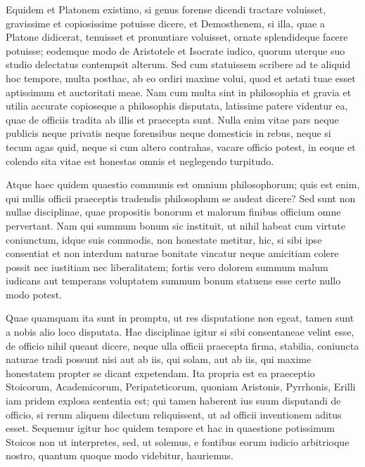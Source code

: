  Equidem et Platonem existimo, si genus forense dicendi tractare voluisset, gravissime et copiosissime potuisse dicere, et Demosthenem, si illa, quae a Platone didicerat, tenuisset et pronuntiare voluisset, ornate splendideque facere potuisse; eodemque modo de Aristotele et Isocrate iudico, quorum uterque suo studio delectatus contempsit alterum. Sed cum statuissem scribere ad te aliquid hoc tempore, multa posthac, ab eo ordiri maxime volui, quod et aetati tuae esset aptissimum et auctoritati meae. Nam cum multa sint in philosophia et gravia et utilia accurate copioseque a philosophis disputata, latissime patere videntur ea, quae de officiis tradita ab illis et praecepta sunt. Nulla enim vitae pars neque publicis neque privatis neque forensibus neque domesticis in rebus, neque si tecum agas quid, neque si cum altero contrahas, vacare officio potest, in eoque et colendo sita vitae est honestas omnis et neglegendo turpitudo.

 Atque haec quidem quaestio communis est omnium philosophorum; quis est enim, qui nullis officii praeceptis tradendis philosophum se audeat dicere? Sed sunt non nullae disciplinae, quae propositis bonorum et malorum finibus officium omne pervertant. Nam qui summum bonum sic instituit, ut nihil habeat cum virtute coniunctum, idque suis commodis, non honestate metitur, hic, si sibi ipse consentiat et non interdum naturae bonitate vincatur neque amicitiam colere possit nec iustitiam nec liberalitatem; fortis vero dolorem summum malum iudicans aut temperans voluptatem summum bonum statuens esse certe nullo modo potest.

 Quae quamquam ita sunt in promptu, ut res disputatione non egeat, tamen sunt a nobis alio loco disputata. Hae disciplinae igitur si sibi consentaneae velint esse, de officio nihil queant dicere, neque ulla officii praecepta firma, stabilia, coniuncta naturae tradi possunt nisi aut ab iis, qui solam, aut ab iis, qui maxime honestatem propter se dicant expetendam. Ita propria est ea praeceptio Stoicorum, Academicorum, Peripateticorum, quoniam Aristonis, Pyrrhonis, Erilli iam pridem explosa sententia est; qui tamen haberent ius suum disputandi de officio, si rerum aliquem dilectum reliquissent, ut ad officii inventionem aditus esset. Sequemur igitur hoc quidem tempore et hac in quaestione potissimum Stoicos non ut interpretes, sed, ut solemus, e fontibus eorum iudicio arbitrioque nostro, quantum quoque modo videbitur, hauriemus.

